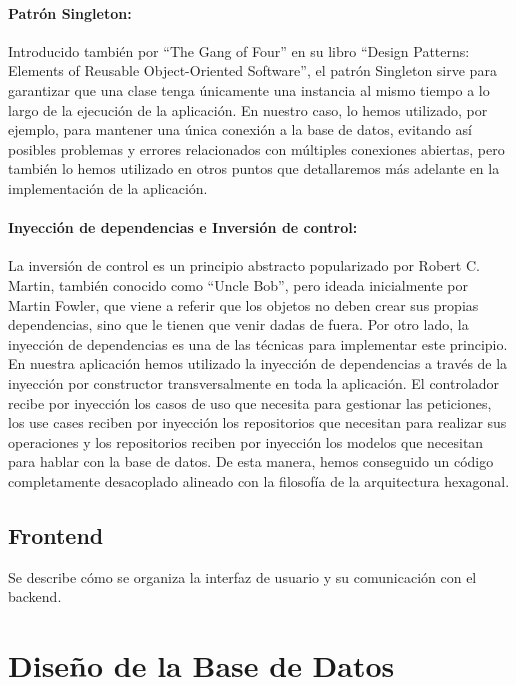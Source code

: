\paragraph{Patrón Singleton:} Introducido también por ``The Gang of Four'' en su libro ``Design Patterns: Elements of Reusable Object-Oriented Software'', 
el patrón Singleton sirve para garantizar que una clase tenga únicamente una instancia al mismo tiempo a lo largo de la ejecución de la aplicación. 
En nuestro caso, lo hemos utilizado, por ejemplo, para mantener una única conexión a la base de datos, evitando así posibles problemas y errores relacionados
con múltiples conexiones abiertas, pero también lo hemos utilizado en otros puntos que detallaremos más adelante en la implementación de la aplicación.

\paragraph{Inyección de dependencias e Inversión de control:} La inversión de control es un principio abstracto popularizado por Robert C. Martin, también conocido 
como ``Uncle Bob'', pero ideada inicialmente por Martin Fowler, que viene a referir que los objetos no deben crear sus propias dependencias, sino que le tienen
que venir dadas de fuera. Por otro lado, la inyección de dependencias es una de las técnicas para implementar este principio. En nuestra aplicación hemos
utilizado la inyección de dependencias a través de la inyección por constructor transversalmente en toda la aplicación. El controlador recibe por inyección
los casos de uso que necesita para gestionar las peticiones, los use cases reciben por inyección los repositorios que necesitan para realizar sus operaciones 
y los repositorios reciben por inyección los modelos que necesitan para hablar con la base de datos. De esta manera, hemos conseguido un código completamente desacoplado
alineado con la filosofía de la arquitectura hexagonal.

\subsection{Frontend}

Se describe cómo se organiza la interfaz de usuario y su comunicación con el backend.

\section{Diseño de la Base de Datos}

